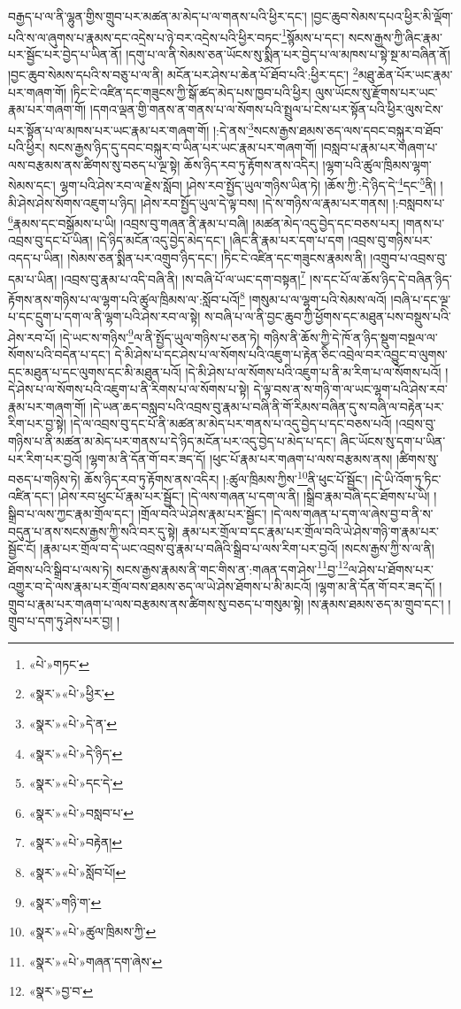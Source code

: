བརྒྱད་པ་ལ་ནི་ལྷུན་གྱིས་གྲུབ་པར་མཚན་མ་མེད་པ་ལ་གནས་པའི་ཕྱིར་དང་། །བྱང་ཆུབ་སེམས་དཔའ་ཕྱིར་མི་ལྡོག་པའི་ས་ལ་ཞུགས་པ་རྣམས་དང་འདྲེས་པ་ཉེ་བར་འདྲེས་པའི་ཕྱིར་བཏང་\footnote{«པེ་»གཏང་}སྙོམས་པ་དང་། སངས་རྒྱས་ཀྱི་ཞིང་རྣམ་པར་སྦྱོང་པར་བྱེད་པ་ཡིན་ནོ། །དགུ་པ་ལ་ནི་སེམས་ཅན་ཡོངས་སུ་སྨིན་པར་བྱེད་པ་ལ་མཁས་པ་སྟེ་སྔ་མ་བཞིན་ནོ། །བྱང་ཆུབ་སེམས་དཔའི་ས་བཅུ་པ་ལ་ནི། མངོན་པར་ཤེས་པ་ཆེན་པོ་ཐོབ་པའི་:ཕྱིར་དང་། \footnote{«སྣར་»«པེ་»ཕྱིར་}མཐུ་ཆེན་པོར་ཡང་རྣམ་པར་གཞག་གོ། །ཏིང་ངེ་འཛིན་དང་གཟུངས་ཀྱི་སྒོ་ཚད་མེད་པས་ཁྱབ་པའི་ཕྱིར། ལུས་ཡོངས་སུ་རྫོགས་པར་ཡང་རྣམ་པར་གཞག་གོ། །དགའ་ལྡན་གྱི་གནས་ན་གནས་པ་ལ་སོགས་པའི་སྤྲུལ་པ་ངེས་པར་སྟོན་པའི་ཕྱིར་ལུས་ངེས་པར་སྟོན་པ་ལ་མཁས་པར་ཡང་རྣམ་པར་གཞག་གོ། །:དེ་ནས་\footnote{«སྣར་»«པེ་»དེ་ན་}སངས་རྒྱས་ཐམས་ཅད་ལས་དབང་བསྐུར་བ་ཐོབ་པའི་ཕྱིར། སངས་རྒྱས་ཉིད་དུ་དབང་བསྐུར་བ་ཡིན་པར་ཡང་རྣམ་པར་གཞག་གོ། །བསླབ་པ་རྣམ་པར་གཞག་པ་ལས་བརྩམས་ནས་ཚིགས་སུ་བཅད་པ་ལྔ་སྟེ། ཆོས་ཉིད་རབ་ཏུ་རྟོགས་ནས་འདིར། །ལྷག་པའི་ཚུལ་ཁྲིམས་ལྷག་སེམས་དང་། ལྷག་པའི་ཤེས་རབ་ལ་རྗེས་སློབ། །ཤེས་རབ་སྤྱོད་ཡུལ་གཉིས་ཡིན་ཏེ། །ཆོས་ཀྱི་:དེ་ཉིད་དེ་\footnote{«སྣར་»«པེ་»དེ་ཉིད་}དང་\footnote{«སྣར་»«པེ་»དང་དེ་}ནི། །མི་ཤེས་ཤེས་སོགས་འཇུག་པ་ཉིད། །ཤེས་རབ་སྤྱོད་ཡུལ་དེ་ལྟ་བས། །དེ་ས་གཉིས་ལ་རྣམ་པར་གནས། །:བསླབས་པ་\footnote{«སྣར་»«པེ་»བསླབ་པ་}རྣམས་དང་བསྒོམས་པ་ཡི། །འབྲས་བུ་གཞན་ནི་རྣམ་པ་བཞི། །མཚན་མེད་འདུ་བྱེད་དང་བཅས་པར། །གནས་པ་འབྲས་བུ་དང་པོ་ཡིན། །དེ་ཉིད་མངོན་འདུ་བྱེད་མེད་དང་། །ཞིང་ནི་རྣམ་པར་དག་པ་དག །འབྲས་བུ་གཉིས་པར་འདད་པ་ཡིན། །སེམས་ཅན་སྨིན་པར་འགྲུབ་ཉིད་དང་། །ཏིང་ངེ་འཛིན་དང་གཟུངས་རྣམས་ནི། །འགྲུབ་པ་འབྲས་བུ་དམ་པ་ཡིན། །འབྲས་བུ་རྣམ་པ་འདི་བཞི་ནི། །ས་བཞི་པོ་ལ་ཡང་དག་བསྟན།\footnote{«སྣར་»«པེ་»བརྟེན།} །ས་དང་པོ་ལ་ཆོས་ཉིད་དེ་བཞིན་ཉིད་རྟོགས་ནས་གཉིས་པ་ལ་ལྷག་པའི་ཚུལ་ཁྲིམས་ལ་:སློབ་པའོ།\footnote{«སྣར་»«པེ་»སློབ་པོ།} །གསུམ་པ་ལ་ལྷག་པའི་སེམས་ལའོ། །བཞི་པ་དང་ལྔ་པ་དང་དྲུག་པ་དག་ལ་ནི་ལྷག་པའི་ཤེས་རབ་ལ་སྟེ། ས་བཞི་པ་ལ་ནི་བྱང་ཆུབ་ཀྱི་ཕྱོགས་དང་མཐུན་པས་བསྡུས་པའི་ཤེས་རབ་པོ། །དེ་ཡང་ས་གཉིས་\footnote{«སྣར་»གཉི་ག་}ལ་ནི་སྤྱོད་ཡུལ་གཉིས་པ་ཅན་ཏེ། གཉིས་ནི་ཆོས་ཀྱི་དེ་ཁོ་ན་ཉིད་སྡུག་བསྔལ་ལ་སོགས་པའི་བདེན་པ་དང་། དེ་མི་ཤེས་པ་དང་ཤེས་པ་ལ་སོགས་པའི་འཇུག་པ་རྟེན་ཅིང་འབྲེལ་བར་འབྱུང་བ་ལུགས་དང་མཐུན་པ་དང་ལུགས་དང་མི་མཐུན་པའོ། །དེ་མི་ཤེས་པ་ལ་སོགས་པའི་འཇུག་པ་ནི་མ་རིག་པ་ལ་སོགས་པའོ། །དེ་ཤེས་པ་ལ་སོགས་པའི་འཇུག་པ་ནི་རིགས་པ་ལ་སོགས་པ་སྟེ། དེ་ལྟ་བས་ན་ས་གཉི་ག་ལ་ཡང་ལྷག་པའི་ཤེས་རབ་རྣམ་པར་གཞག་གོ། །དེ་ཡན་ཆད་བསླབ་པའི་འབྲས་བུ་རྣམ་པ་བཞི་ནི་གོ་རིམས་བཞིན་དུ་ས་བཞི་ལ་བརྟེན་པར་རིག་པར་བྱ་སྟེ། །དེ་ལ་འབྲས་བུ་དང་པོ་ནི་མཚན་མ་མེད་པར་གནས་པ་འདུ་བྱེད་པ་དང་བཅས་པའོ། །འབྲས་བུ་གཉིས་པ་ནི་མཚན་མ་མེད་པར་གནས་པ་དེ་ཉིད་མངོན་པར་འདུ་བྱེད་པ་མེད་པ་དང་། ཞིང་ཡོངས་སུ་དག་པ་ཡིན་པར་རིག་པར་བྱའོ། །ལྷག་མ་ནི་དོན་གོ་བར་ཟད་དོ། །ཕུང་པོ་རྣམ་པར་གཞག་པ་ལས་བརྩམས་ནས། །ཚིགས་སུ་བཅད་པ་གཉིས་ཏེ། ཆོས་ཉིད་རབ་ཏུ་རྟོགས་ནས་འདིར། །:ཚུལ་ཁྲིམས་ཀྱིས་\footnote{«སྣར་»«པེ་»ཚུལ་ཁྲིམས་ཀྱི་}ནི་ཕུང་པོ་སྦྱོང་། །དེ་ཡི་འོག་ཏུ་ཏིང་འཛིན་དང་། །ཤེས་རབ་ཕུང་པོ་རྣམ་པར་སྦྱོང་། །དེ་ལས་གཞན་པ་དག་ལ་ནི། །སྒྲིབ་རྣམ་བཞི་དང་ཐོགས་པ་ཡི། །སྒྲིབ་པ་ལས་ཀྱང་རྣམ་གྲོལ་དང་། །གྲོལ་བའི་ཡེ་ཤེས་རྣམ་པར་སྦྱོང་། །དེ་ལས་གཞན་པ་དག་ལ་ཞེས་བྱ་བ་ནི་ས་བདུན་པ་ནས་སངས་རྒྱས་ཀྱི་སའི་བར་དུ་སྟེ། རྣམ་པར་གྲོལ་བ་དང་རྣམ་པར་གྲོལ་བའི་ཡེ་ཤེས་གཉི་ག་རྣམ་པར་སྦྱོང་ངོ། །རྣམ་པར་གྲོལ་བ་དེ་ཡང་འབྲས་བུ་རྣམ་པ་བཞིའི་སྒྲིབ་པ་ལས་རིག་པར་བྱའོ། །སངས་རྒྱས་ཀྱི་ས་ལ་ནི། ཐོགས་པའི་སྒྲིབ་པ་ལས་ཏེ། སངས་རྒྱས་རྣམས་ནི་གང་གིས་ན་:གཞན་དག་ཤེས་\footnote{«སྣར་»«པེ་»གཞན་དག་ཞེས་}བྱ་\footnote{«སྣར་»བྱ་བ་}ལ་ཤེས་པ་ཐོགས་པར་འགྱུར་བ་དེ་ལས་རྣམ་པར་གྲོལ་བས་ཐམས་ཅད་ལ་ཡེ་ཤེས་ཐོགས་པ་མི་མངའོ། །ལྷག་མ་ནི་དོན་གོ་བར་ཟད་དོ། །གྲུབ་པ་རྣམ་པར་གཞག་པ་ལས་བརྩམས་ནས་ཚིགས་སུ་བཅད་པ་གསུམ་སྟེ། །ས་རྣམས་ཐམས་ཅད་མ་གྲུབ་དང་། །གྲུབ་པ་དག་ཏུ་ཤེས་པར་བྱ། །

